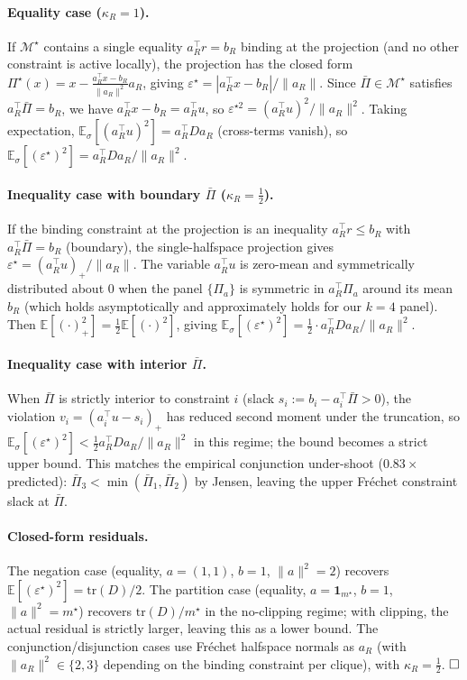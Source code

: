 \documentclass{article}
\theoremstyle{plain}
\theoremstyle{definition}
\theoremstyle{remark}
\newcommand{\Mjoint}{\mathcal{M}^{\star}}
\newcommand{\Pijoint}{\Pi^{\star}}
\newcommand{\E}{\mathbb{E}}
\newcommand{\eps}{\varepsilon}
\begin{document}
\paragraph{Equality case ($\kappa_R = 1$).}
If $\Mjoint$ contains a single equality $a_R^\top r = b_R$ binding at
the projection (and no other constraint is active locally), the
projection has the closed form
$\Pijoint(x) = x - \frac{a_R^\top x - b_R}{\|a_R\|^2} a_R$, giving
$\eps^\star = |a_R^\top x - b_R|/\|a_R\|$. Since $\bar\Pi \in \Mjoint$
satisfies $a_R^\top \bar\Pi = b_R$, we have $a_R^\top x - b_R =
a_R^\top u$, so $\eps^{\star 2} = (a_R^\top u)^2/\|a_R\|^2$. Taking
expectation,
$\E_\sigma[(a_R^\top u)^2] = a_R^\top D a_R$ (cross-terms vanish), so
$\E_\sigma[(\eps^\star)^2] = a_R^\top D a_R / \|a_R\|^2$.

\paragraph{Inequality case with boundary $\bar\Pi$ ($\kappa_R = \tfrac12$).}
If the binding constraint at the projection is an inequality
$a_R^\top r \le b_R$ with $a_R^\top \bar\Pi = b_R$ (boundary), the
single-halfspace projection gives
$\eps^\star = (a_R^\top u)_+/\|a_R\|$. The variable $a_R^\top u$ is
zero-mean and symmetrically distributed about $0$ when the panel
$\{\Pi_a\}$ is symmetric in $a_R^\top \Pi_a$ around its mean $b_R$
(which holds asymptotically and approximately holds for our $k\!=\!4$
panel). Then $\E[(\cdot)_+^2] = \tfrac12 \E[(\cdot)^2]$, giving
$\E_\sigma[(\eps^\star)^2] = \tfrac12 \cdot a_R^\top D a_R/\|a_R\|^2$.

\paragraph{Inequality case with interior $\bar\Pi$.}
When $\bar\Pi$ is strictly interior to constraint $i$ (slack
$s_i := b_i - a_i^\top \bar\Pi > 0$), the violation
$v_i = (a_i^\top u - s_i)_+$ has reduced second moment under the
truncation, so $\E_\sigma[(\eps^\star)^2] < \tfrac12 a_R^\top D
a_R/\|a_R\|^2$ in this regime; the bound becomes a strict upper
bound. This matches the empirical conjunction under-shoot
($0.83\times$ predicted): $\bar\Pi_3 < \min(\bar\Pi_1, \bar\Pi_2)$ by
Jensen, leaving the upper Fr\'echet constraint slack at $\bar\Pi$.

\paragraph{Closed-form residuals.}
The negation case (equality, $a\!=\!(1,1)$, $b\!=\!1$, $\|a\|^2\!=\!2$)
recovers $\E[(\eps^\star)^2] = \mathrm{tr}(D)/2$. The partition case
(equality, $a\!=\!\mathbf 1_{m^\star}$, $b\!=\!1$, $\|a\|^2\!=\!m^\star$)
recovers $\mathrm{tr}(D)/m^\star$ in the no-clipping regime; with
clipping, the actual residual is strictly larger, leaving this as a
lower bound. The conjunction/disjunction cases use Fr\'echet
halfspace normals as $a_R$ (with $\|a_R\|^2 \in \{2,3\}$ depending on
the binding constraint per clique), with $\kappa_R = \tfrac12$.
$\hfill\square$
\end{document}
